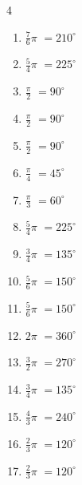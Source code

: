 \begin{multicols}{4}
\begin{enumerate}
  \item $\displaystyle \frac{7}{6}\pi$
        $\displaystyle =210^{\circ}$

  \item $\displaystyle \frac{5}{4}\pi$
        $\displaystyle =225^{\circ}$

  \item $\displaystyle \frac{\pi}{2}$
        $\displaystyle =90^{\circ}$

  \item $\displaystyle \frac{\pi}{2}$
        $\displaystyle =90^{\circ}$

  \item $\displaystyle \frac{\pi}{2}$
        $\displaystyle =90^{\circ}$

  \item $\displaystyle \frac{\pi}{4}$
        $\displaystyle =45^{\circ}$

  \item $\displaystyle \frac{\pi}{3}$
        $\displaystyle =60^{\circ}$

\columnbreak %

  \item $\displaystyle \frac{5}{4}\pi$
        $\displaystyle =225^{\circ}$

  \item $\displaystyle \frac{3}{4}\pi$
        $\displaystyle =135^{\circ}$

  \item $\displaystyle \frac{5}{6}\pi$
        $\displaystyle =150^{\circ}$

  \item $\displaystyle \frac{5}{6}\pi$
        $\displaystyle =150^{\circ}$

  \item $\displaystyle 2\pi$
        $\displaystyle =360^{\circ}$

  \item $\displaystyle \frac{3}{2}\pi$
        $\displaystyle =270^{\circ}$

  \item $\displaystyle \frac{3}{4}\pi$
        $\displaystyle =135^{\circ}$

  \item $\displaystyle \frac{4}{3}\pi$
        $\displaystyle =240^{\circ}$

  \item $\displaystyle \frac{2}{3}\pi$
        $\displaystyle =120^{\circ}$

  \item $\displaystyle \frac{2}{3}\pi$
        $\displaystyle =120^{\circ}$


\end{enumerate}
\end{multicols}
